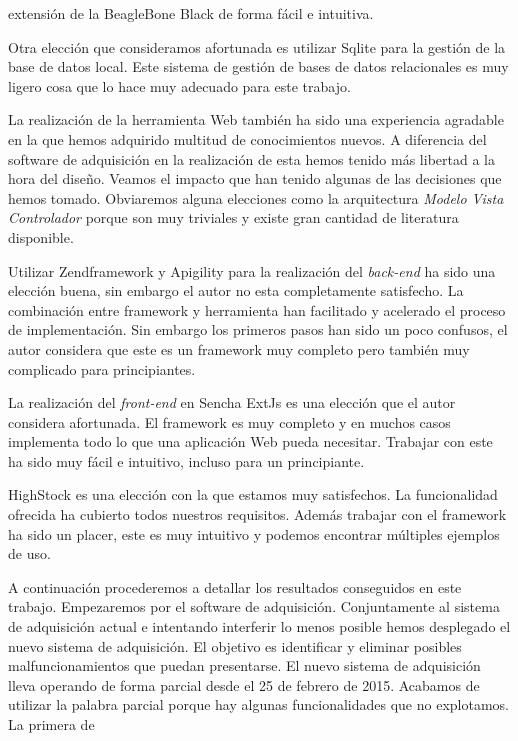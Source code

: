 	extensión de la BeagleBone Black de forma fácil e intuitiva.    
	\par
	Otra elección que consideramos afortunada es utilizar Sqlite\cite{Sqlite} para la gestión de la base de datos local. Este sistema de gestión
	de bases de datos relacionales es muy ligero cosa que lo hace muy adecuado para este trabajo.
	\par
	La realización de la herramienta Web también ha sido una experiencia agradable en la que hemos adquirido multitud de conocimientos nuevos. A
	diferencia del software de adquisición en la realización de esta hemos tenido más libertad a la hora del diseño. Veamos el impacto que han
	tenido algunas de las decisiones que hemos tomado. Obviaremos alguna elecciones como la arquitectura \emph{Modelo Vista Controlador} porque
	son muy triviales y existe gran cantidad de literatura disponible.
	\par
	Utilizar Zendframework y Apigility para la realización del \emph{back-end} ha sido una elección buena, sin embargo el autor no esta
	completamente satisfecho. La combinación entre framework y herramienta han facilitado y acelerado el proceso de implementación. Sin embargo
	los primeros pasos han sido un poco confusos, el autor considera que este es un framework muy completo pero también muy complicado para
	principiantes.
	\par
	La realización del \emph{front-end} en Sencha ExtJs es una elección que el autor considera afortunada. El framework es muy completo y en
	muchos casos implementa todo lo que una aplicación Web pueda necesitar. Trabajar con este ha sido muy fácil e intuitivo, incluso para un
	principiante. 
	\par
	HighStock es una elección con la que estamos muy satisfechos. La funcionalidad ofrecida ha cubierto todos nuestros requisitos. Además trabajar
	con el framework ha sido un placer, este es muy intuitivo y podemos encontrar múltiples ejemplos de uso.
	\par
	A continuación procederemos a detallar los resultados conseguidos en este trabajo. Empezaremos por el software de adquisición. Conjuntamente
	al sistema de adquisición actual e intentando interferir lo menos posible hemos desplegado el nuevo sistema de adquisición. El objetivo es
	identificar y eliminar posibles malfuncionamientos que puedan presentarse. El nuevo sistema de adquisición lleva operando de forma parcial
	desde el 25 de febrero de 2015. Acabamos de utilizar la palabra parcial porque hay algunas funcionalidades que no explotamos. La primera de
